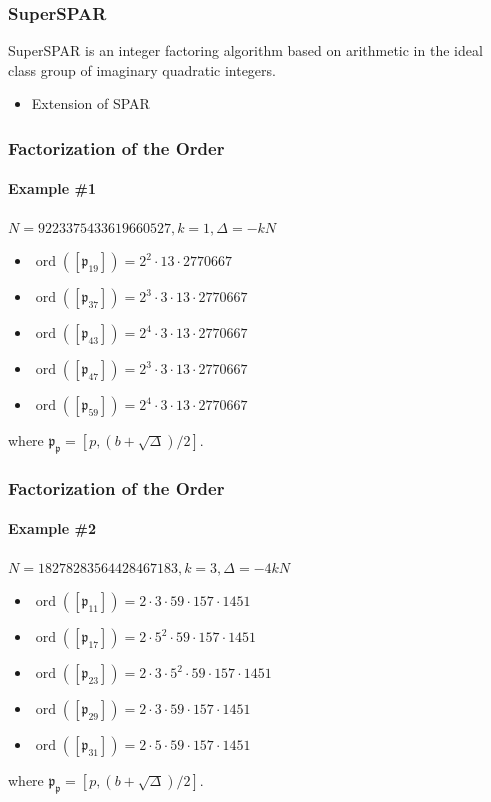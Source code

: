 \documentclass{beamer}
\DeclareMathOperator{\ord}{ord}
\newcommand{\ideal}{\mathfrak}
\newcommand{\idealclass}[1]{\left[ \ideal #1 \right]}
\begin{document}
\begin{frame}
\frametitle{SuperSPAR}

SuperSPAR is an integer factoring algorithm based on arithmetic in the ideal class group of imaginary quadratic integers.
\begin{itemize}
\item Extension of SPAR 
\end{itemize}

\end{frame}

\begin{frame}
\frametitle{Factorization of the Order}
\framesubtitle{Example \#1}

$N = 9223375433619660527, k = 1, \Delta = -kN$
\begin{itemize}
\item $\ord(\idealclass{p_{19}}) = 2^2 \cdot 13 \cdot 2770667$
\item $\ord(\idealclass{p_{37}}) = 2^3 \cdot 3 \cdot 13 \cdot 2770667$
\item $\ord(\idealclass{p_{43}}) = 2^4 \cdot 3 \cdot 13 \cdot 2770667$
\item $\ord(\idealclass{p_{47}}) = 2^3 \cdot 3 \cdot 13 \cdot 2770667$
\item $\ord(\idealclass{p_{59}}) = 2^4 \cdot 3 \cdot 13 \cdot 2770667$
\end{itemize}

where $\ideal{p_p} = [p, (b + \sqrt\Delta)/2]$.

\end{frame}

\begin{frame}
\frametitle{Factorization of the Order}
\framesubtitle{Example \#2}

$N = 18278283564428467183, k = 3, \Delta = -4kN$
\begin{itemize}
\item $\ord(\idealclass{p_{11}}) = 2 \cdot 3 \cdot 59 \cdot 157 \cdot 1451$
\item $\ord(\idealclass{p_{17}}) = 2 \cdot 5^2 \cdot 59 \cdot 157 \cdot 1451$
\item $\ord(\idealclass{p_{23}}) = 2 \cdot 3 \cdot 5^2 \cdot 59 \cdot 157 \cdot 1451$
\item $\ord(\idealclass{p_{29}}) = 2 \cdot 3 \cdot 59 \cdot 157 \cdot 1451$
\item $\ord(\idealclass{p_{31}}) = 2 \cdot 5 \cdot 59 \cdot 157 \cdot 1451$

\end{itemize}

where $\ideal{p_p} = [p, (b + \sqrt\Delta)/2]$.

\end{frame}
\end{document}
